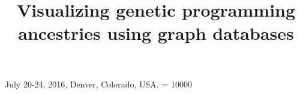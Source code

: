 \documentclass{sig-alternate}
\begin{document}
 {July 20-24, 2016, Denver, Colorado, USA.}
\widowpenalty = 10000

\title{Visualizing genetic programming ancestries using graph databases}


\maketitle
\end{document}
